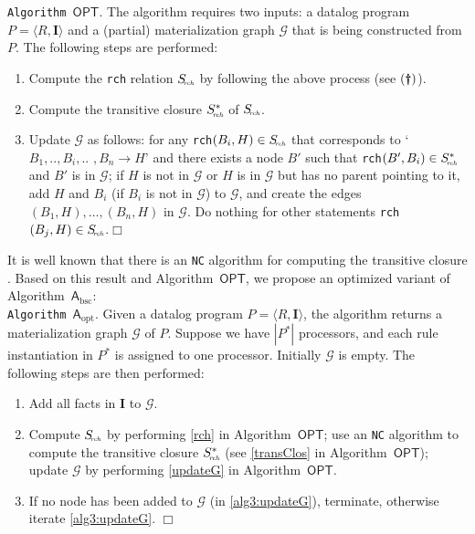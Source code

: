 \noindent\texttt{Algorithm~$\mathsf{OPT}$}. The algorithm requires two inputs:
a datalog program $P=\langle R, \textbf{I}\rangle$ and a (partial) materialization graph $\mathcal{G}$ that is
being constructed from $P$. The following steps are performed:
\begin{enumerate}[leftmargin=6ex,label=(\textbf{\roman*})]
\item Compute the \texttt{rch} relation $S_{\!\textit{\tiny rch}}$ by following the above process (see $(\textbf{\dag})$).\label{rch}
\item Compute the transitive closure $S^*_{\!\textit{\tiny rch}}$ of $S_{\!\textit{\tiny rch}}$.\label{transClos}
\item Update $\mathcal{G}$ as follows: for any \texttt{rch}$(B_i,H)\in S_{\!\textit{\tiny rch}}$
that corresponds to `$B_1,..,B_i,..$ $,B_n\rightarrow H$'
    and there exists a node $B'$ such that \texttt{rch}$(B',B_i)\in S^*_{\!\textit{\tiny rch}}$ and $B'$ is
    in $\mathcal{G}$; if $H$ is not in $\mathcal{G}$ or $H$ is in $\mathcal{G}$ but has no parent pointing
    to it, add $H$ and $B_i$ (if $B_i$ is not in $\mathcal{G}$) to $\mathcal{G}$, and create the edges
    $(B_1, H), \ldots, (B_n, H)$ in $\mathcal{G}$. Do nothing for other statements
    \texttt{rch}$(B_j,H)\in S_{\!\textit{\tiny rch}}$.\label{updateG}\hfill$\Box$
\end{enumerate}

It is well known that there is an \texttt{NC} algorithm for computing the
transitive closure \cite{Allender07}.
Based on this result and Algorithm~$\mathsf{OPT}$, we propose an optimized variant of Algorithm~$\mathsf{A}_{\text{bsc}}$:\\

\noindent\texttt{Algorithm~$\mathsf{A}_{\text{opt}}$}. Given a datalog program $P=\langle R, \textbf{I}\rangle$, the algorithm
returns a materialization graph $\mathcal{G}$ of $P$.
Suppose we have $|P^*|$ processors, and each rule instantiation in $P^*$ is
assigned to one processor.
Initially $\mathcal{G}$ is empty. The following steps are then performed:
\begin{enumerate}[leftmargin=8ex,label=(\textit{Step \arabic*}),ref=Step~\arabic*]
\item Add all facts in $\textbf{I}$ to $\mathcal{G}$.\label{alg3:addFacts}
\item Compute $S_{\!\textit{\tiny rch}}$ by performing \ref{rch} in Algorithm~$\mathsf{OPT}$; use an \texttt{NC}
    algorithm to compute the transitive closure $S^*_{\!\textit{\tiny rch}}$ (see \ref{transClos} in Algorithm~$\mathsf{OPT}$);
    update $\mathcal{G}$ by performing \ref{updateG}  in Algorithm~$\mathsf{OPT}$.\label{alg3:updateG}
\item If no node has been added to $\mathcal{G}$ (in \ref{alg3:updateG}), terminate,
    otherwise iterate \ref{alg3:updateG}. \label{alg3:halt}\hfill$\Box$
\end{enumerate}

